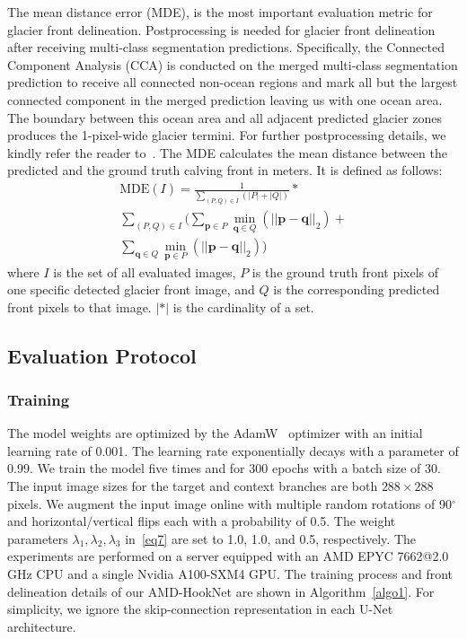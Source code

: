 \documentclass[lettersize,journal,siunitx]{IEEEtran}
\begin{document}
The mean distance error (MDE), is the most important evaluation metric for glacier front delineation. Postprocessing is needed for glacier front delineation after receiving multi-class segmentation predictions. Specifically, the Connected Component Analysis (CCA) is conducted on the merged multi-class segmentation prediction to receive all connected non-ocean regions and mark all but the largest connected component in the merged prediction leaving us with one ocean area. The boundary between this ocean area and all adjacent predicted glacier zones produces the 1-pixel-wide glacier termini. For further postprocessing details, we kindly refer the reader to~\cite{essd-14-4287-2022}. The MDE calculates the mean distance between the predicted and the ground truth calving front in meters. It is defined as follows:
\begin{multline}
    \mathrm{MDE}(I)=\frac{1}{\sum_{(P,Q)\in{I}}{(|P|+|Q|)}}\ast \\ \sum_{(P,Q)\in{I}}\bigl(\sum_{\bm{p}\in{P}}\min\limits_{\bm{q}\in{Q}}(||\bm{p}-\bm{q}||_2) + \\ \sum_{\bm{q}\in{Q}}\min\limits_{\bm{p}\in{P}}(||\bm{p}-\bm{q}||_2)\bigr)
\end{multline}
where $I$ is the set of all evaluated images, $P$ is the ground truth front pixels of one specific detected glacier front image, and $Q$ is the corresponding predicted front pixels to that image. $|*|$ is the cardinality of a set.

\subsection{Evaluation Protocol}
\subsubsection{Training}
The model weights are optimized by the AdamW~\cite{kingma2014adam} optimizer with an initial learning rate of 0.001. The learning rate exponentially decays with a parameter of 0.99. We train the model five times and for 300 epochs with a batch size of 30. The input image sizes for the target and context branches are both $288\times288$ pixels. We augment the input image online with multiple random rotations of 90$^\circ$ and horizontal/vertical flips each with a probability of 0.5. The weight parameters $\lambda{_1},\lambda{_2}, \lambda{_3}$ in~\cref{eq7} are set to 1.0, 1.0, and 0.5, respectively. The experiments are performed on a server equipped with an AMD EPYC 7662@2.0 GHz CPU and a single Nvidia A100-SXM4 GPU. The training process and front delineation details of our AMD-HookNet are shown in Algorithm~\ref{algo1}. For simplicity, we ignore the skip-connection representation in each U-Net architecture.
\end{document}

